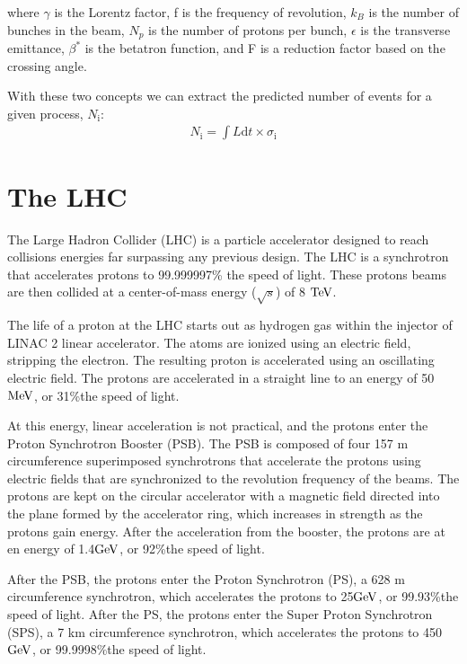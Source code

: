 where $\gamma$ is the Lorentz factor,  f is the frequency of revolution, $k_{B}$ is the number of bunches in the beam, $N_{p}$ is the number of protons per bunch, 
$\epsilon$ is the transverse emittance, $\beta^{*}$ is the betatron function, and F is a reduction factor based on the crossing angle.  

With these two concepts we can extract the predicted number of events for a given process, $N_{\mathrm{i}}$: 
\begin{eqnarray}
N_{\mathrm{i}} = \int L \mathrm{d}t \times \sigma_{\mathrm{i}} 
\label{eqn:Nevents}
\end{eqnarray}  

\section{The LHC}
The Large Hadron Collider (LHC) is a particle accelerator designed to reach collisions energies far surpassing any previous design.  
The LHC is a synchrotron that accelerates protons to 99.999997\% the speed of light.  
These protons beams are then collided at a center-of-mass energy ($\sqrt{s}$) of 8 $\mathrm{TeV}$.  


The life of a proton at the LHC starts out as hydrogen gas within the injector of LINAC 2 linear accelerator.  
The atoms are ionized using an electric field, stripping the electron.  
The resulting proton is accelerated using an oscillating electric field.  
The protons are accelerated in a straight line to an energy of 50$\mathrm{MeV}$, or 31\%the speed of light.  

At this energy, linear acceleration is not practical, and the protons enter the Proton Synchrotron Booster (PSB).  
The PSB is composed of four 157 m circumference superimposed synchrotrons that accelerate the protons using electric fields that are synchronized to the revolution frequency of the beams.  
The protons are kept on the circular accelerator with a magnetic field directed into the plane formed by the accelerator ring, which increases in strength as the protons gain energy.  
After the acceleration from the booster, the protons are at en energy of 1.4$\mathrm{GeV}$, or 92\%the speed of light.

After the PSB, the protons enter the Proton Synchrotron (PS), a 628 m circumference synchrotron, which accelerates the protons to 25$\mathrm{GeV}$, or 99.93\%the speed of light.  
After the PS, the protons enter the Super Proton Synchrotron (SPS), a 7 km circumference synchrotron, which accelerates the protons to 450$\mathrm{GeV}$, or 99.9998\%the speed of light.


